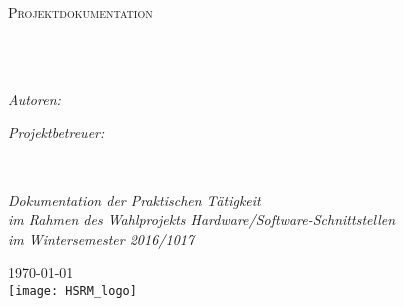 \documentclass[
11pt, %
oneside, %
ngerman, 
singlespacing, %
parskip, %
headsepline, %
chapterinoneline, %
]{MastersDoctoralThesis} %
\author{Andreas \textsc{Rollbühler},\\ Jens \textsc{Nazarenus},\\ Nils \textsc{Geiselhart}} %
\begin{document}
\frontmatter %

\pagestyle{plain} %


\begin{titlepage}
\begin{center}

\vspace*{.06\textheight}
{\scshape\LARGE \univname\par}\vspace{1.5cm} %
\textsc{\Large Projektdokumentation}\\[0.5cm] %

\HRule \\[0.4cm] %
{\huge \bfseries \ttitle\par}\vspace{0.4cm} %
\HRule \\[1.5cm] %
 
\begin{minipage}[t]{0.4\textwidth}

\begin{flushleft} \large
\emph{Autoren:}\\
\authorname %
\end{flushleft}
\end{minipage}
\begin{minipage}[t]{0.4\textwidth}
\begin{flushright} \large
\emph{Projektbetreuer:} \\
\href{https://www.cs.hs-rm.de/~reith/}{\supname} %
\end{flushright}
\end{minipage}\\[3cm]
 
\vfill

\large \textit{Dokumentation der Praktischen Tätigkeit\\ im Rahmen des Wahlprojekts Hardware/Software-Schnittstellen\\ im Wintersemester 2016/1017}
\\[1cm] %
 
\vfill

{\large \today}\\[2cm] %

\texttt{[image: HSRM\_logo]} %
 
\vfill
\end{center}
\end{titlepage}
\end{document}
